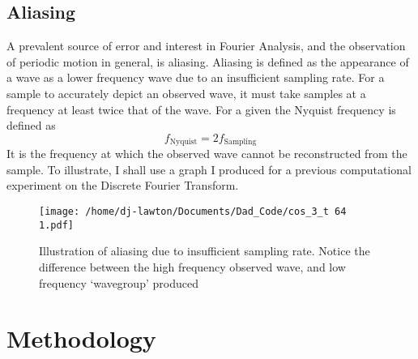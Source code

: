 \documentclass{article}
\begin{document}
\subsection{Aliasing}
A prevalent source of error and interest in Fourier Analysis, and the observation of periodic motion in general, is aliasing. Aliasing is defined as the appearance of a wave as a lower frequency wave due to an insufficient sampling rate. For a sample to accurately depict an observed wave, it must take samples at a frequency at least twice that of the wave. For a given the Nyquist frequency is defined as
\begin{equation}
f_{\text{Nyquist}} = 2f_{\text{Sampling}}
\end{equation}
It is the frequency at which the observed wave cannot be reconstructed from the sample. To illustrate, I shall use a graph I produced for a previous computational experiment on the Discrete Fourier Transform.
\begin{figure}[H]
\begin{center}
\texttt{[image: /home/dj-lawton/Documents/Dad\_Code/cos\_3\_t 64 1.pdf]}
\caption{\label{fig:DFTeg}Illustration of aliasing due to insufficient sampling rate. Notice the difference between the high frequency observed wave, and low frequency `wavegroup' produced}
\end{center}
\end{figure}
\section{Methodology}
\end{document}
